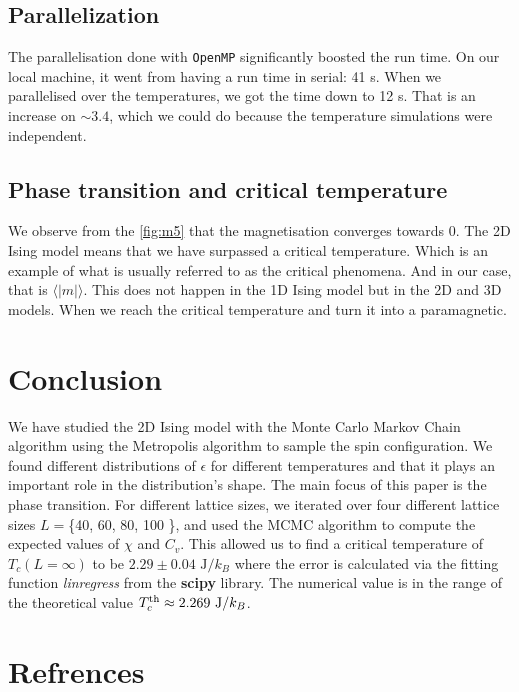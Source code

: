 \documentclass[english,notitlepage,reprint,nofootinbib]{revtex4-2}  %
\begin{document}
	\subsection{Parallelization}\label{subsec: dis parallelization}
	The parallelisation done with \lstinline{OpenMP} significantly boosted the run time.
	On our local machine, it went from having a run time in serial: 41 s.
	When we parallelised over the temperatures, we got the time down to 12 s.
	That is an increase on $\sim 3.4$, which we could do because the temperature simulations were independent.

	\subsection{Phase transition and critical temperature}\label{subsec: dis phase transition}
	We observe from the \autoref{fig:m5} that the magnetisation converges towards 0.
	The 2D Ising model means that we have surpassed a critical temperature.
	Which is an example of what is usually referred to as the critical phenomena.
	And in our case, that is $\langle |m| \rangle$.
	This does not happen in the 1D Ising model but in the 2D and 3D models.
	When we reach the critical temperature and turn it into a paramagnetic.

	
	\section{Conclusion}\label{sec:conclusion}
	We have studied the 2D Ising model with the Monte Carlo Markov Chain algorithm
	using the Metropolis algorithm to sample the spin configuration. We found different distributions of $\epsilon$ for different temperatures and that it plays
	an important role in the distribution's shape. The main focus of this paper is the
	phase transition. For different lattice sizes, we iterated over four different lattice
	sizes $L=$\{40, 60, 80, 100 \}, and used the MCMC algorithm to compute the expected values
	of $\chi$ and $C_v$. This allowed us to find a critical temperature of $T_c(L=\infty)$
	to be $ 2.29 \pm 0.04 \text{ J}/k_{B} $ where the error is calculated via the fitting function
	\textit{linregress} from the \textbf{scipy} library. The numerical value is in the range
	of the theoretical value $T_{c}^{\rm th} \approx 2.269 \text{ J}/k_{B}$.
	
	\onecolumngrid
	\section*{Refrences}
	
	
	
\end{document}
